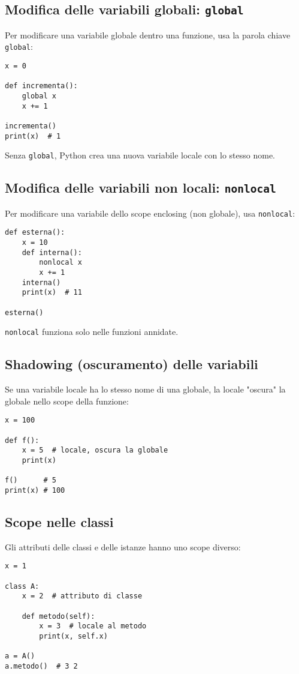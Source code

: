 \documentclass[a4paper,12pt]{article}
\begin{document}
\subsection*{Modifica delle variabili globali: \texttt{global}}
Per modificare una variabile globale dentro una funzione, usa la parola chiave \texttt{global}:
\begin{lstlisting}
x = 0

def incrementa():
    global x
    x += 1

incrementa()
print(x)  # 1
\end{lstlisting}
Senza \texttt{global}, Python crea una nuova variabile locale con lo stesso nome.

\subsection*{Modifica delle variabili non locali: \texttt{nonlocal}}
Per modificare una variabile dello scope enclosing (non globale), usa \texttt{nonlocal}:
\begin{lstlisting}
def esterna():
    x = 10
    def interna():
        nonlocal x
        x += 1
    interna()
    print(x)  # 11

esterna()
\end{lstlisting}
\texttt{nonlocal} funziona solo nelle funzioni annidate.

\subsection*{Shadowing (oscuramento) delle variabili}
Se una variabile locale ha lo stesso nome di una globale, la locale "oscura" la globale nello scope della funzione:
\begin{lstlisting}
x = 100

def f():
    x = 5  # locale, oscura la globale
    print(x)

f()      # 5
print(x) # 100
\end{lstlisting}

\subsection*{Scope nelle classi}
Gli attributi delle classi e delle istanze hanno uno scope diverso:
\begin{lstlisting}
x = 1

class A:
    x = 2  # attributo di classe

    def metodo(self):
        x = 3  # locale al metodo
        print(x, self.x)

a = A()
a.metodo()  # 3 2
\end{lstlisting}
\end{document}
